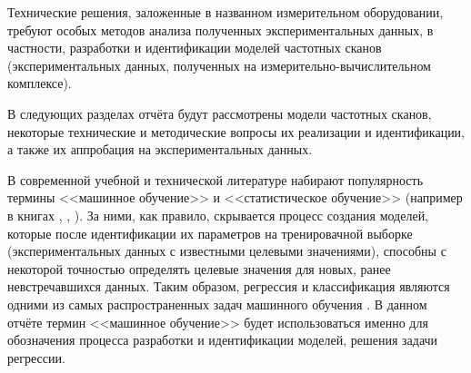 Технические решения, заложенные в названном измерительном оборудовании, требуют
особых методов анализа полученных экспериментальных данных, в частности,
разработки и идентификации моделей частотных сканов (экспериментальных данных, 
полученных на измерительно-вычислительном комплексе).

В следующих разделах отчёта будут рассмотрены модели частотных сканов, некоторые
технические и методические вопросы их реализации и идентификации, а также их
аппробация на экспериментальных данных.

В современной учебной и технической литературе набирают популярность термины 
<<машинное обучение>> и <<статистическое обучение>> (например в книгах 
\cite{hands_on_ml}, \cite{nikolenko_deep_learning}, 
\cite{elements_of_statistical_learning}). За ними, как правило, скрывается
процесс создания моделей, которые после идентификации их параметров на
тренировачной выборке (экспериментальных данных с известными целевыми 
значениями), способны с некоторой точностью определять целевые значения для
новых, ранее невстречавшихся данных. Таким образом, регрессия и классификация
являются одними из самых распространенных задач машинного обучения 
\cite{hands_on_ml}. В данном отчёте термин <<машинное обучение>> будет 
использоваться именно для обозначения процесса разработки и идентификации 
моделей, решения задачи регрессии.